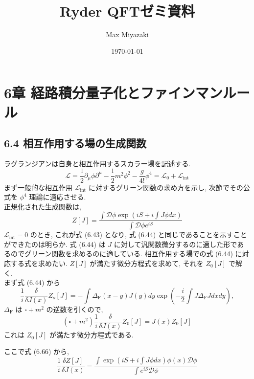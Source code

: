 \documentclass{jsarticle}
\title{Ryder QFTゼミ資料}
\date{\today}
\author{Max Miyazaki}
\begin{document}
\maketitle
\section*{\textrm{6章 経路積分量子化とファインマンルール}}
\subsection*{\textrm{6.4 相互作用する場の生成関数}}

ラグランジアンは自身と相互作用するスカラー場を記述する.
\begin{equation*}
    \mathcal{L} = \frac{1}{2}\partial_\mu \phi \partial^\mu -\frac{1}{2}m^2 \phi^2 -\frac{g}{4!}\phi^4 = \mathcal{L}_0 + \mathcal{L}_\textrm{int} \tag{6.65}
\end{equation*}
まず一般的な相互作用 $\mathcal{L}_\textrm{int}$ に対するグリーン関数の求め方を示し, 次節でその公式を $\phi^4$ 理論に適応させる.\\
正規化された生成関数は,
\begin{equation}
    Z[J] = \frac{\displaystyle\int \mathcal{D}\phi \exp\left( iS + i\int J \phi dx \right)}{\displaystyle \int \mathcal{D}\phi e^{iS}} \tag{6.66}
\end{equation}
$\mathcal{L}_\textrm{int} = 0$ のとき, これが式 (6.43) となり, 式 (6.44) と同じであることを示すことができたのは明らか. 式 (6.44) は $J$ に対して汎関数微分するのに適した形であるのでグリーン関数を求めるのに適している. 相互作用する場での式 (6.44) に対応する式を求めたい. $Z[J]$ が満たす微分方程式を求めて, それを $Z_0[J]$ で解く.\\
まず式 (6.44) から
\begin{equation*}
    \frac{1}{i}\frac{\delta}{\delta J(x)} Z_o[J] = -\int \Delta_\textrm{F}(x-y)J(y)dy \exp\left( -\frac{i}{2}\int J\Delta_\textrm{F}J dxdy \right),
\end{equation*}
$\Delta_\textrm{F}$ は $\square + m^2$ の逆数を引くので,
\begin{equation*}
    (\square + m^2)\frac{1}{i}\frac{\delta}{\delta J(x)}Z_0[J] = J(x)Z_0[J] \tag{6.67}
\end{equation*}
これは $Z_0[J]$ が満たす微分方程式である.\par
ここで式 (6.66) から,
\begin{equation*}
    \frac{1}{i}\frac{\delta Z[J]}{\delta J(x)} = \frac{\displaystyle \int \exp\left( iS + i\int J\phi dx \right)\phi(x)\mathcal{D}\phi}{\displaystyle \int e^{iS}\mathcal{D}\phi} \tag{6.68}
\end{equation*}
\end{document}
